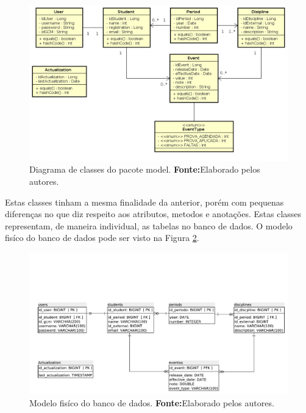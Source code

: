 	
	\begin{figure}[h!]
		\centerline{\includegraphics[scale=0.6]{./imagens/2_q_metodologico/4_procedimentos_resultados/43_webservice/432_desenvolvimento/diagrama.png}}
		\caption[Diagrama de classes do pacote model]{Diagrama de classes do pacote
		model.
			\textbf{Fonte:}Elaborado pelos autores.}
		\label{fig:desws12}
	\end{figure}
	
	\pagebreak
	
	\par Estas classes tinham a mesma finalidade da anterior, porém com pequenas
diferenças no que diz respeito aos atributos, metodos e anotações. Estas classes
representam, de maneira individual, as tabelas no banco de dados. O modelo
fisíco do banco de dados pode ser visto na Figura \ref{fig:desws12_1}.
	
	
	\begin{figure}[h!]
		\centerline{\includegraphics[scale=0.50]{./imagens/2_q_metodologico/4_procedimentos_resultados/43_webservice/432_desenvolvimento/mer_ws.pdf}}
		\caption[Modelo fisíco do banco de dados]{Modelo fisíco do banco de dados.
			\textbf{Fonte:}Elaborado pelos autores.}
		\label{fig:desws12_1}
	\end{figure}
	
